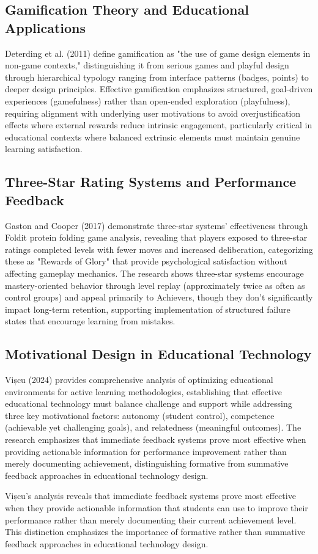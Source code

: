 {\color{maroon}
\subsection{Gamification Theory and Educational Applications}

Deterding et al. (2011) define gamification as "the use of game design elements in non-game contexts," distinguishing it from serious games and playful design through hierarchical typology ranging from interface patterns (badges, points) to deeper design principles. Effective gamification emphasizes structured, goal-driven experiences (gamefulness) rather than open-ended exploration (playfulness), requiring alignment with underlying user motivations to avoid overjustification effects where external rewards reduce intrinsic engagement, particularly critical in educational contexts where balanced extrinsic elements must maintain genuine learning satisfaction.

\subsection{Three-Star Rating Systems and Performance Feedback}

Gaston and Cooper (2017) demonstrate three-star systems' effectiveness through Foldit protein folding game analysis, revealing that players exposed to three-star ratings completed levels with fewer moves and increased deliberation, categorizing these as "Rewards of Glory" that provide psychological satisfaction without affecting gameplay mechanics. The research shows three-star systems encourage mastery-oriented behavior through level replay (approximately twice as often as control groups) and appeal primarily to Achievers, though they don't significantly impact long-term retention, supporting implementation of structured failure states that encourage learning from mistakes.


\subsection{Motivational Design in Educational Technology}

Vișcu (2024) provides comprehensive analysis of optimizing educational environments for active learning methodologies, establishing that effective educational technology must balance challenge and support while addressing three key motivational factors: autonomy (student control), competence (achievable yet challenging goals), and relatedness (meaningful outcomes). The research emphasizes that immediate feedback systems prove most effective when providing actionable information for performance improvement rather than merely documenting achievement, distinguishing formative from summative feedback approaches in educational technology design.

Vișcu's analysis reveals that immediate feedback systems prove most effective when they provide actionable information that students can use to improve their performance rather than merely documenting their current achievement level. This distinction emphasizes the importance of formative rather than summative feedback approaches in educational technology design.
}

